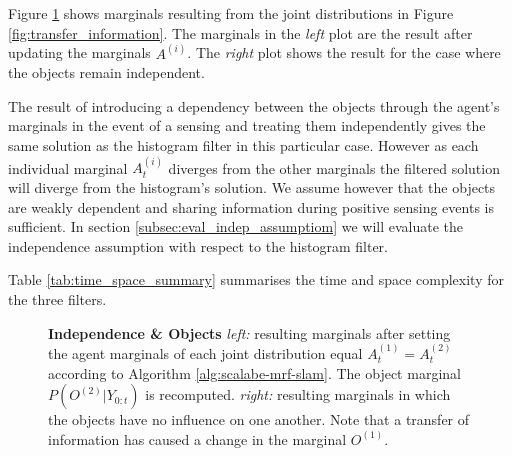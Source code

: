 Figure \ref{fig:independence_object} shows marginals resulting from the joint distributions in Figure \ref{fig:transfer_information}. The marginals in
the \textit{left} plot are the result after updating the marginals $A^{(i)}$. The \textit{right} plot shows the result for the case where the objects
remain independent. 

The result of introducing a dependency between the objects through the agent's marginals in the event of a sensing and treating them
independently gives the same solution as the histogram filter in this particular case. However as each individual marginal $A^{(i)}_t$ diverges 
from the other marginals the filtered solution will diverge from the histogram's solution. We assume however that the objects are weakly 
dependent and sharing information during positive sensing events is sufficient. In section \ref{subsec:eval_indep_assumptiom} we will 
evaluate the independence assumption with respect to the histogram filter.

Table \ref{tab:time_space_summary} summarises the time and space complexity for the three filters.%

\begin{figure}
  \centering
  \caption{\textbf{Independence \& Objects} \textit{left:} resulting marginals after setting the agent marginals of each 
  joint distribution equal $A^{(1)}_t = A^{(2)}_t$ according to Algorithm \ref{alg:scalabe-mrf-slam}. The object marginal $P(O^{(2)}|Y_{0:t})$ is recomputed. 
  \textit{right:} resulting marginals in which the objects have no influence on one another.
  Note that a transfer of information has caused a change in the marginal $O^{(1)}$.}
  \label{fig:independence_object}
\end{figure}



